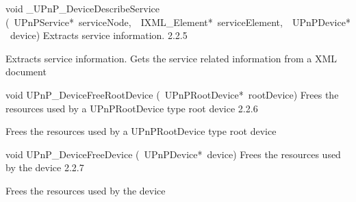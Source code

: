 \documentclass{article}
\begin{document}
\begin{cxxentry}
\begin{cxxentry}
\begin{cxxfunction}
\begin{cxxdoc}
\end{cxxdoc}
\end{cxxfunction}
\begin{cxxfunction}
{void}
        {\_UPnP\_DeviceDescribeService}
        {(\ UPnPService*\ serviceNode,\ \ IXML\_Element*\ serviceElement,\ \ UPnPDevice*\ device)}
        {Extracts service information.}
        {2.2.5}
\begin{cxxdoc}
Extracts service information. Gets the service related information from a XML
document


\end{cxxdoc}
\end{cxxfunction}
\begin{cxxfunction}
{void}
        {UPnP\_DeviceFreeRootDevice}
        {(\ UPnPRootDevice*\ rootDevice)}
        {Frees the resources used by a UPnPRootDevice type root device}
        {2.2.6}
\begin{cxxdoc}
Frees the resources used by a UPnPRootDevice type root device


\end{cxxdoc}
\end{cxxfunction}
\begin{cxxfunction}
{void}
        {UPnP\_DeviceFreeDevice}
        {(\ UPnPDevice*\ device)}
        {Frees the resources used by the device}
        {2.2.7}
\begin{cxxdoc}
Frees the resources used by the device



\end{cxxdoc}
\end{cxxfunction}
\end{cxxentry}
\end{cxxentry}
\end{document}
